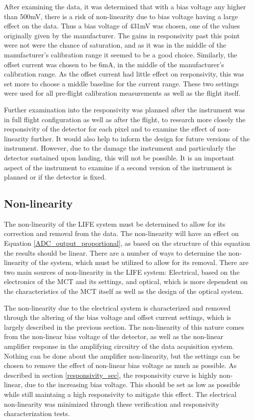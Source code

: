 After examining the data, it was determined that with a bias voltage any higher than 500mV, there is a risk of non-linearity due to bias voltage having a large effect on the data. Thus a bias voltage of 431mV was chosen, one of the values originally given by the manufacturer. The gains in responsivity past this point were not were the chance of saturation, and as it was in the middle of the manufacturer's calibration range it seemed to be a good choice. Similarly, the offset current was chosen to be 6mA, in the middle of the manufacturer's calibration range. As the offset current had little effect on responsivity, this was set more to choose a middle baseline for the current range. These two settings were used for all pre-flight calibration measurements as well as the flight itself.

Further examination into the responsivity was planned after the instrument was in full flight configuration as well as after the flight, to research more closely the responsivity of the detector for each pixel and to examine the effect of non-linearity further. It would also help to inform the design for future versions of the instrument. However, due to the damage the instrument and particularly the detector sustained upon landing, this will not be possible. It is an important aspect of the instrument to examine if a second version of the instrument is planned or if the detector is fixed.

\subsection{Non-linearity}\label{non-linearity_sec}
The non-linearity of the LIFE system must be determined to allow for its correction and removal from the data. The non-linearity will have an effect on Equation \ref{ADC_output_proportional}, as based on the structure of this equation the results should be linear. There are a number of ways to determine the non-linearity of the system, which must be utilized to allow for its removal. There are two main sources of non-linearity in the LIFE system: Electrical, based on the electronics of the MCT and its settings, and optical, which is more dependent on the characteristics of the MCT itself as well as the design of the optical system.

The non-linearity due to the electrical system is characterized and removed through the altering of the bias voltage and offset current settings, which is largely described in the previous section. The non-linearity of this nature comes from the non-linear bias voltage of the detector, as well as the non-linear amplifier response in the amplifying circuitry of the data acquisition system. Nothing can be done about the amplifier non-linearity, but the settings can be chosen to remove the effect of non-linear bias voltage as much as possible. As described in section \ref{responsivity_sec}, the responsivity curve is highly non-linear, due to the increasing bias voltage. This should be set as low as possible while still maintaing a high responsivity to mitigate this effect. The electrical non-linearity was minimized through these verification and responsivity characterization tests.

